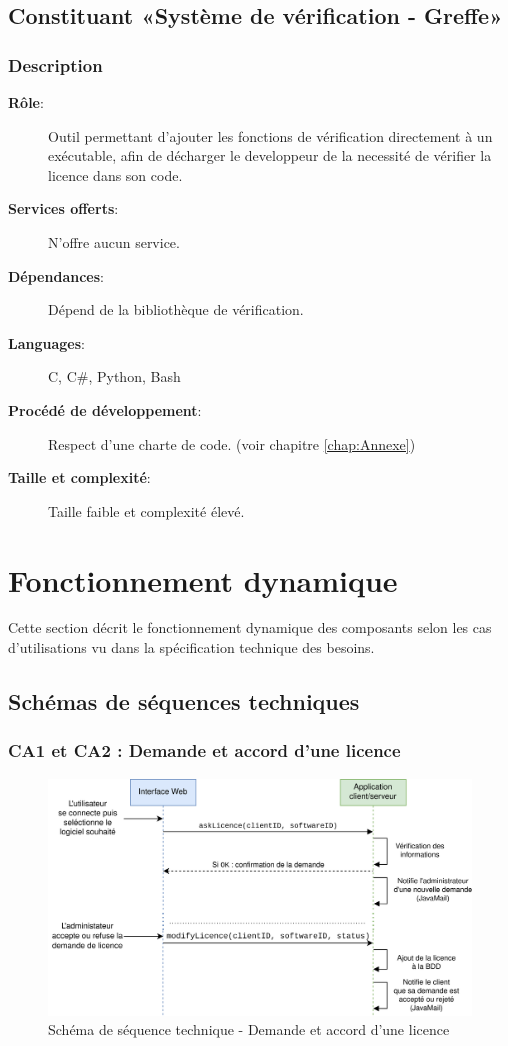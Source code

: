 \section{Constituant «Système de vérification - Greffe»}
\subsection*{Description}
\begin{description}
	\item[\textbf{Rôle}:]
			Outil permettant d'ajouter les fonctions de vérification directement à un
			exécutable, afin de décharger le developpeur de la necessité de vérifier 
			la licence dans son code.
	\item[\textbf{Services offerts}:]
		N'offre aucun service.
	\item[\textbf{Dépendances}:]
		Dépend de la bibliothèque de vérification.
	\item[\textbf{Languages}:]
		C, C\#, Python, Bash 
	\item[\textbf{Procédé de développement}:]
		Respect d'une charte de code. (voir chapitre \ref{chap:Annexe}) 
	\item[\textbf{Taille et complexité}:]
		Taille faible et complexité élevé.
\end{description}


\chapter{Fonctionnement dynamique}
Cette section décrit le fonctionnement dynamique des composants selon les cas d'utilisations vu
dans la spécification technique des besoins.

\section{Schémas de séquences techniques}

\subsection{CA1 et CA2 : Demande et accord d'une licence}
\begin{figure}[!h]
    \centering
    \includegraphics[width=\textwidth]{../png/SSD-demande-licence.png}
    \caption{Schéma de séquence technique - Demande et accord d'une licence}
\end{figure}
\newpage

